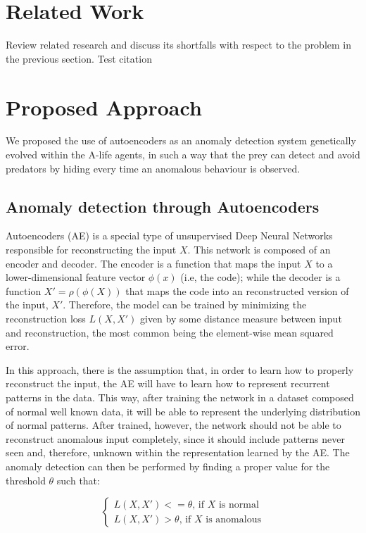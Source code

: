 \documentclass[letterpaper]{article}
\numberwithin{equation}{section}
\numberwithin{theorem}{section}
\numberwithin{lemma}{section}
\numberwithin{df}{section}
\begin{document}
\section{Related Work}

Review related research and discuss its shortfalls with respect to the problem in the previous section. Test citation \cite{1703.00548}

\section{Proposed Approach}

We proposed the use of autoencoders as an anomaly detection system genetically evolved within the A-life agents, in such a way that the prey can detect and avoid predators by hiding every time an anomalous behaviour is observed.

\subsection{Anomaly detection through Autoencoders}

Autoencoders (AE) is a special type of unsupervised Deep Neural Networks responsible for reconstructing the input $X$. This network is composed of an encoder and decoder. The encoder is a function that maps the input $X$ to a lower-dimensional feature vector $\phi(x)$ (i.e, the code); while the decoder is a function $X' = \rho(\phi(X))$ that maps the code into an reconstructed version of the input, $X'$. Therefore, the model can be trained by minimizing the reconstruction loss $L(X, X')$ given by some distance measure between input and reconstruction, the most common being the element-wise mean squared error.

In this approach, there is the assumption that, in order to learn how to properly reconstruct the input, the AE will have to learn how to represent recurrent patterns in the data. This way, after training the network in a dataset composed of normal well known data, it will be able to represent the underlying distribution of normal patterns. After trained, however, the network should not be able to reconstruct anomalous input completely, since it should include patterns never seen and, therefore, unknown within the representation learned by the AE. The anomaly detection can then be performed by finding a proper value for the threshold $\theta$ such that:

\begin{equation}
\begin{cases}
L(X, X') <= \theta \text{, if $X$ is normal} \\
L(X, X') > \theta \text{, if $X$ is anomalous}
\end{cases}
\end{equation} 
\end{document}

